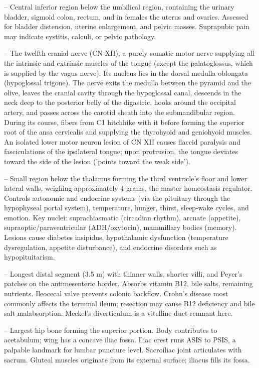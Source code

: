 -- Central inferior region below the umbilical region, containing the urinary bladder, sigmoid colon, rectum, and in females the uterus and ovaries. Assessed for bladder distension, uterine enlargement, and pelvic masses. Suprapubic pain may indicate cystitis, calculi, or pelvic pathology.

-- The twelfth cranial nerve (CN XII), a purely somatic motor nerve supplying all the intrinsic and extrinsic muscles of the tongue (except the palatoglossus, which is supplied by the vagus nerve). Its nucleus lies in the dorsal medulla oblongata (hypoglossal trigone). The nerve exits the medulla between the pyramid and the olive, leaves the cranial cavity through the hypoglossal canal, descends in the neck deep to the posterior belly of the digastric, hooks around the occipital artery, and passes across the carotid sheath into the submandibular region. During its course, fibers from C1 hitchhike with it before forming the superior root of the ansa cervicalis and supplying the thyrohyoid and geniohyoid muscles. An isolated lower motor neuron lesion of CN XII causes flaccid paralysis and fasciculations of the ipsilateral tongue; upon protrusion, the tongue deviates toward the side of the lesion ('points toward the weak side').

-- Small region below the thalamus forming the third ventricle's floor and lower lateral walls, weighing approximately 4 grams, the master homeostasis regulator. Controls autonomic and endocrine systems (via the pituitary through the hypophyseal portal system), temperature, hunger, thirst, sleep-wake cycles, and emotion. Key nuclei: suprachiasmatic (circadian rhythm), arcuate (appetite), supraoptic/paraventricular (ADH/oxytocin), mammillary bodies (memory). Lesions cause diabetes insipidus, hypothalamic dysfunction (temperature dysregulation, appetite disturbance), and endocrine disorders such as hypopituitarism.

-- Longest distal segment (3.5 m) with thinner walls, shorter villi, and Peyer's patches on the antimesenteric border. Absorbs vitamin B12, bile salts, remaining nutrients. Ileocecal valve prevents colonic backflow. Crohn's disease most commonly affects the terminal ileum; resection may cause B12 deficiency and bile salt malabsorption. Meckel's diverticulum is a vitelline duct remnant here.

-- Largest hip bone forming the superior portion. Body contributes to acetabulum; wing has a concave iliac fossa. Iliac crest runs ASIS to PSIS, a palpable landmark for lumbar puncture level. Sacroiliac joint articulates with sacrum. Gluteal muscles originate from its external surface; iliacus fills its fossa.

